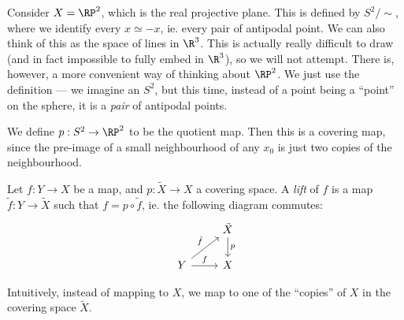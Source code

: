 \documentclass[a4paper]{article}
\begin{document}
\begin{eg}
  Consider $X = \RP^2$, which is the real projective plane. This is defined by $S^2/{\sim}$, where we identify every $x\simeq -x$, ie. every pair of antipodal point. We can also think of this as the space of lines in $\R^3$. This is actually really difficult to draw (and in fact impossible to fully embed in $\R^3$), so we will not attempt. There is, however, a more convenient way of thinking about $\RP^2$. We just use the definition --- we imagine an $S^2$, but this time, instead of a point being a ``point'' on the sphere, it is a \emph{pair} of antipodal points.
  \begin{center}
  \end{center}
  We define $p: S^2 \to \RP^2$ to be the quotient map. Then this is a covering map, since the pre-image of a small neighbourhood of any $x_0$ is just two copies of the neighbourhood.
\end{eg}

\begin{defi}[Lifting]
  Let $f: Y\to X$ be a map, and $p: \tilde{X} \to X$ a covering space. A \emph{lift} of $f$ is a map $\tilde{f}: Y\to \tilde{X}$ such that $f = p\circ \tilde{f}$, ie. the following diagram commutes:
  \[
    \begin{tikzcd}
      & \tilde{X} \ar[d, "p"]\\
      Y \ar[ur, "\tilde{f}"] \ar [r, "f"] & X
    \end{tikzcd}
  \]
\end{defi}
Intuitively, instead of mapping to $X$, we map to one of the ``copies'' of $X$ in the covering space $\tilde{X}$.
\end{document}
